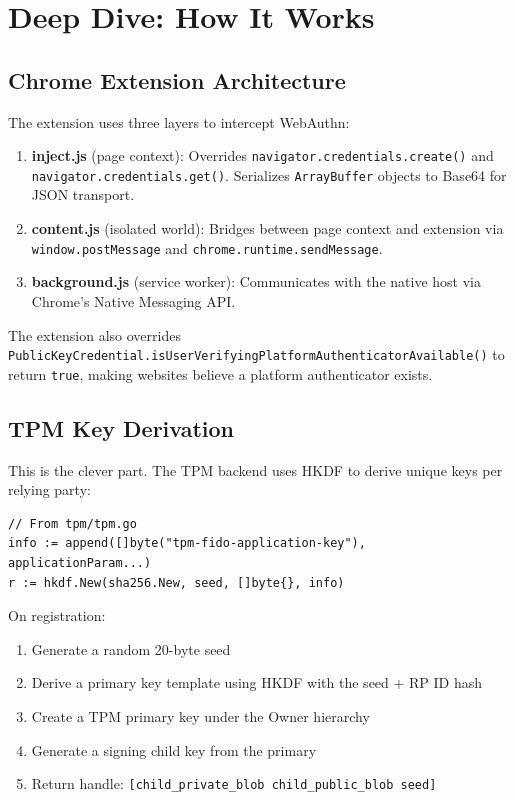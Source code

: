 \documentclass{article}
\begin{document}
\section{Deep Dive: How It Works}

\subsection{Chrome Extension Architecture}

The extension uses three layers to intercept WebAuthn:

\begin{enumerate}
\item \textbf{inject.js} (page context): Overrides \texttt{navigator.credentials.create()} and \texttt{navigator.credentials.get()}. Serializes \texttt{ArrayBuffer} objects to Base64 for JSON transport.

\item \textbf{content.js} (isolated world): Bridges between page context and extension via \texttt{window.postMessage} and \texttt{chrome.runtime.sendMessage}.

\item \textbf{background.js} (service worker): Communicates with the native host via Chrome's Native Messaging API.

\end{enumerate}

The extension also overrides \texttt{PublicKeyCredential.isUserVerifyingPlatformAuthenticatorAvailable()} to return \texttt{true}, making websites believe a platform authenticator exists.

\subsection{TPM Key Derivation}

This is the clever part. The TPM backend uses HKDF to derive unique keys per relying party:

\begin{verbatim}
// From tpm/tpm.go
info := append([]byte("tpm-fido-application-key"), applicationParam...)
r := hkdf.New(sha256.New, seed, []byte{}, info)
\end{verbatim}

On registration:

\begin{enumerate}
\item Generate a random 20-byte seed

\item Derive a primary key template using HKDF with the seed + RP ID hash

\item Create a TPM primary key under the Owner hierarchy

\item Generate a signing child key from the primary

\item Return handle: \texttt{{[}child\_private\_blob \textbar{} child\_public\_blob \textbar{} seed{]}}

\end{enumerate}
\end{document}
